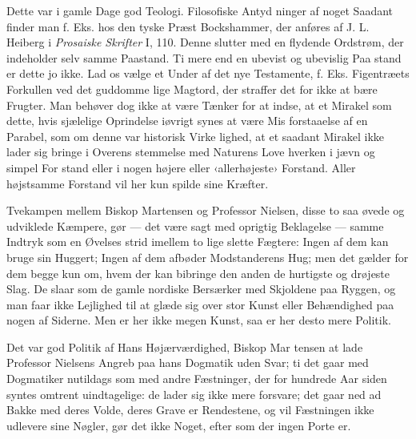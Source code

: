 \documentclass[12pt,a4paper,openany]{book}
\newcommand{\opage}[1]{\marginnote{\footnotesize\textit{[#1]}}}
\begin{document}
Dette var i gamle Dage god Teologi. Filosofiske Antyd\-%
ninger af noget Saadant finder man f. Eks. hos den tyske Præst
Bockshammer, der anføres af J. L. Heiberg i \emph{Prosaiske Skrifter} I, 110.
Denne slutter med en flydende Ordstrøm, der indeholder selv\-%
samme Paastand. Ti mere end en ubevist og ubevislig Paa\-%
stand er dette jo ikke. Lad os vælge et Under af det nye
Testamente, f. Eks. Figentræets Forkullen ved det guddomme\-%
lige Magtord, der straffer det for ikke at bære Frugter. Man
behøver dog ikke at være Tænker for at indse, at et Mirakel
som dette, hvis sjælelige Oprindelse iøvrigt synes at være Mis\-%
forstaaelse af en Parabel, som om denne var historisk Virke\-%
lighed, at et saadant Mirakel ikke lader sig bringe i Overens\-%
stemmelse med Naturens Love hverken i jævn og simpel For\-%
stand eller i nogen højere eller ‹allerhøjeste› Forstand. Aller\-%
højstsamme Forstand vil her kun spilde sine Kræfter.

Tvekampen mellem Biskop Martensen og Professor Nielsen,
disse to saa øvede og udviklede Kæmpere, gør --- det være
sagt med oprigtig Beklagelse --- samme Indtryk som en Øvelses\-%
strid imellem to lige slette Fægtere: Ingen af dem kan bruge sin
Huggert; Ingen af dem afbøder Modstanderens Hug; men det
\opage{91}gælder for dem begge kun om, hvem der kan bibringe den
anden de hurtigste og drøjeste Slag. De slaar som de gamle
nordiske Bersærker med Skjoldene paa Ryggen, og man faar ikke
Lejlighed til at glæde sig over stor Kunst eller Behændighed
paa nogen af Siderne. Men er her ikke megen Kunst, saa er
her desto mere Politik.

Det var god Politik af Hans Højærværdighed, Biskop Mar\-%
tensen at lade Professor Nielsens Angreb paa hans Dogmatik
uden Svar; ti det gaar med Dogmatiker nutildags som med
andre Fæstninger, der for hundrede Aar siden syntes omtrent
uindtagelige: de lader sig ikke mere forsvare; det gaar ned ad
Bakke med deres Volde, deres Grave er Rendestene, og vil
Fæstningen ikke udlevere sine Nøgler, gør det ikke Noget, efter\-%
som der ingen Porte er.
\end{document}
